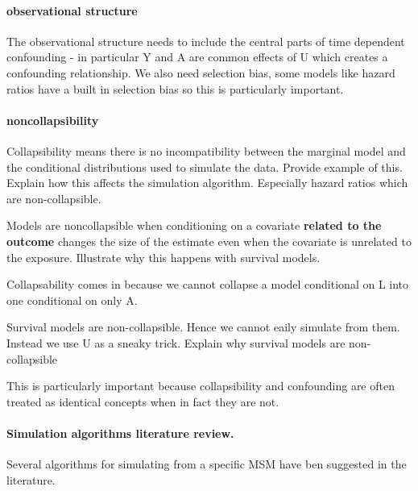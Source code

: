 \documentclass[11pt]{article}
\begin{document}
\paragraph{observational structure}\label{observational-structure}

The observational structure needs to include the central parts of time
dependent confounding - in particular Y and A are common effects of U
which creates a confounding relationship. We also need selection bias,
some models like hazard ratios have a built in selection bias so this is
particularly important.

\paragraph{noncollapsibility}\label{noncollapsibility}

Collapsibility means there is no incompatibility between the marginal
model and the conditional distributions used to simulate the data.
Provide example of this. Explain how this affects the simulation
algorithm. Especially hazard ratios which are non-collapsible.

Models are noncollapsible when conditioning on a covariate
\textbf{related to the outcome} changes the size of the estimate even
when the covariate is unrelated to the exposure. Illustrate why this
happens with survival models.

Collapsability comes in because we cannot collapse a model conditional
on L into one conditional on only A.

Survival models are non-collapsible. Hence we cannot eaily simulate from
them. Instead we use U as a sneaky trick. Explain why survival models
are non-collapsible

This is particularly important because collapsibility and confounding
are often treated as identical concepts when in fact they are not.
\citet{Greenland1999}

\paragraph{Simulation algorithms literature
review.}\label{simulation-algorithms-literature-review.}

Several algorithms for simulating from a specific MSM have ben suggested
in the literature.

\citet{Havercroft2012} \citet{Bryan2004} \citet{Westreich2012}
\citet{Young2014}
\end{document}
